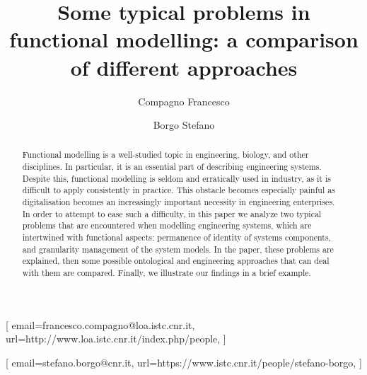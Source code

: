 \documentclass[
]{ceurart}
\begin{document}


\title{Some typical problems in functional modelling: a comparison of different approaches}


\author[1,2]{Compagno Francesco}[%
email=francesco.compagno@loa.istc.cnr.it,
url=http://www.loa.istc.cnr.it/index.php/people,
]
\cormark[1]
\address[1]{ISTC-CNR Laboratory for Applied Ontology, via alla cascata 56/C, 38123, Povo, Italy}
\address[2]{Adige S.P.A, via per Barco, 11, Levico Terme, 38056, Italy}

\author[1]{Borgo Stefano}[%
email=stefano.borgo@cnr.it,
url=https://www.istc.cnr.it/people/stefano-borgo,
]



\begin{abstract}
  Functional modelling is a well-studied topic in engineering, biology, and other disciplines. 
  In particular, it is an essential part of describing engineering systems.
  Despite this, functional modelling is seldom and erratically used in industry, as it is difficult to apply consistently in practice.
  This obstacle becomes especially painful as digitalisation becomes an increasingly important necessity in engineering enterprises.
  In order to attempt to ease such a difficulty, in this paper we analyze two typical problems that are encountered when modelling engineering systems, which are intertwined with functional aspects: permanence of identity of systems components, and granularity management of the system models.
  In the paper, these problems are explained, then some possible ontological and engineering approaches that can deal with them are compared.
  Finally, we illustrate our findings in a brief example.
  \TODO{[S: va sistemato]}
\end{abstract}
\end{document}
